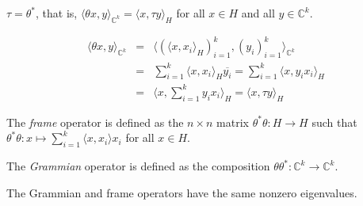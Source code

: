 \documentclass[12pt]{article}
\begin{document}
$\tau = \theta^\ast$, that is, $\langle \theta x, y\rangle_{{\mathbb C}^k} = \langle x, \tau y\rangle_H$ for all $x \in H$ and all $y \in {\mathbb C}^k$.

\begin{eqnarray*}
\langle \theta x, y\rangle_{{\mathbb C}^k} & = & \langle (\langle x, x_i \rangle_H)_{i=1}^k, (y_i)_{i=1}^k \rangle_{{\mathbb C}^k} \\
& = & \sum_{i=1}^k \langle x, x_i \rangle_H \overline{y_i} = \sum_{i=1}^k \langle x, y_i x_i \rangle_H \\
&= & \langle x , \sum_{i=1}^k y_i x_i \rangle_H = \langle x, \tau y \rangle_H
\end{eqnarray*}

The {\it frame} operator is defined as the $n\times n$ matrix $\theta^\ast\theta : H \rightarrow H$ such that $\theta^\ast\theta : x \mapsto \sum_{i=1}^k \langle x, x_i \rangle x_i$ for all $x \in H$.

The {\it Grammian} operator is defined as the composition $\theta \theta^\ast: {\mathbb C}^k \rightarrow {\mathbb C}^k$. 

The Grammian and frame operators have the same nonzero eigenvalues.
\end{document}
